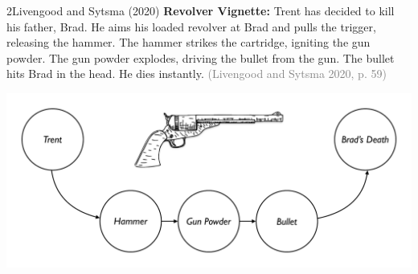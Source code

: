 \documentclass[xcolor=table,9pt,aspectratio=169]{beamer}
\begin{document}
\begin{frame}{\vspace*{10mm}2\hspace*{1em}Livengood and Sytsma (2020)}
\vspace*{-5mm}
\textbf{Revolver Vignette:} Trent has decided to kill his father, Brad. He aims his loaded revolver at Brad and pulls the trigger, releasing the hammer. The hammer strikes the cartridge, igniting the gun powder. The gun powder explodes, driving the bullet from the gun. The bullet hits Brad in the head. He dies instantly. \textcolor{gray}{(Livengood and Sytsma 2020, p. 59)}
\begin{center}
   \includegraphics[width=0.75\linewidth]{figures/revolver_2.pdf}
\end{center}
\end{frame}
\end{document}
